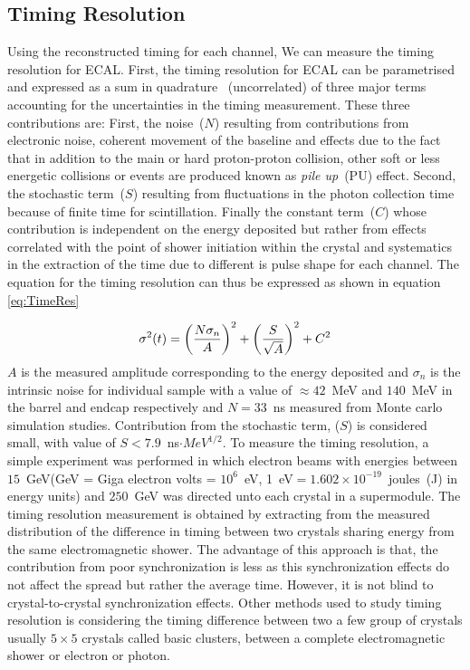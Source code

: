 \subsection{Timing Resolution}
Using the reconstructed timing for each channel, We can measure the timing resolution for ECAL.
First, the timing resolution for ECAL can be parametrised and expressed as a sum in quadrature ~(uncorrelated) of three major terms accounting for the uncertainties in the timing measurement. These three contributions are: First, the noise~($N$) resulting from contributions from electronic noise, coherent movement of the baseline and effects due to the fact that in addition to the main or hard proton-proton collision, other soft or less energetic collisions or events are produced known as \textit{pile up}~(PU) effect. Second, the stochastic term~($S$) resulting from fluctuations in the photon collection time because of finite time for \pb scintillation. Finally the constant term~($C$) whose contribution is independent on the energy deposited but rather from effects correlated with the point of shower initiation within the crystal and systematics in the extraction of the time due to different is pulse shape for each channel.
The equation for the timing resolution can thus be expressed as shown in equation \ref{eq:TimeRes}

\begin{equation}{\label{eq:TimeRes}}
\sigma^{2}(t) = \left(\frac{N\sigma_{n}}{A}\right)^{2} + \left(\frac{S}{\sqrt{A}}\right)^{2} + C^{2}
\end{equation}
$A$ is the measured amplitude corresponding to the energy deposited and $\sigma_{n}$ is the intrinsic noise for individual sample with a value of $\approx 42$~MeV and $140$~MeV in the barrel and endcap respectively and $N = 33$~ns measured from Monte carlo simulation studies. Contribution from the stochastic term, ($S$) is considered small, with value of $S < 7.9$~ns$\cdot MeV^{1/2}$.
\newline
To measure the timing resolution, a simple experiment was performed in which electron beams with energies between $15$~GeV(GeV = Giga electron volts = $10^{6}$~eV, 1~eV$ = 1.602 \times 10^{-19}$~joules~(J) in energy units) and $250$~GeV was directed unto each crystal in a supermodule. The timing resolution measurement is obtained by extracting from the measured distribution of the difference in timing between two crystals sharing energy from the same electromagnetic shower. The advantage of this approach is that, the contribution from poor synchronization is less as this synchronization effects do not affect the spread but rather the average time. However, it is not blind to crystal-to-crystal synchronization effects.
Other methods used to study timing resolution is considering the timing difference between two a few group of crystals usually $5\times5$  crystals called basic clusters, between a complete electromagnetic shower or electron or photon.

